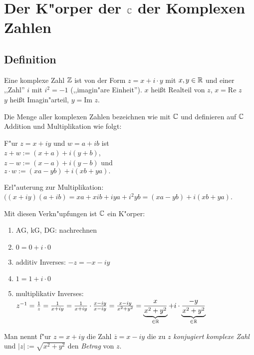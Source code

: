 \section{Der K"orper der $\mathbb{C}$ der Komplexen Zahlen} 

\subsection{Definition}
Eine komplexe Zahl $\mathbb{Z}$ ist von der Form $z=x+i\cdot y$ mit $x, y \in \mathbb{R}$ und einer ,,Zahl'' $i$ mit $i^2=-1$ (,,imagin"are Einheit''). $x$ heißt Realteil von $z$, $x=$Re $z$\\
$y$ heißt Imagin"arteil, $y=$Im $z$.

Die Menge aller komplexen Zahlen bezeichnen wie mit $\mathbb{C}$ und definieren auf $\mathbb{C}$ Addition und Multiplikation wie folgt:

F"ur $z=x+iy$ und $w=a+ib$ ist \\$z+w:= (x+a) + i (y+b)$, \\$z-w:= (x-a) + i (y-b)$ und \\$z\cdot w:= (xa-yb) + i(xb+ya).$

Erl"auterung zur Multiplikation: $((x+iy)(a+ib) = xa + xib + iya + i^2yb = (xa-yb) + i(xb+ya)$.

Mit diesen Verkn"upfungen ist $\mathbb{C}$ ein K"orper:
\begin{enumerate}
	\item
	AG, kG, DG: nachrechnen
	\item
	$0=0+i\cdot 0$
	\item
	additiv Inverses: $-z = -x-iy$
	\item
	$1=1+i\cdot 0$
	\item
	multiplikativ Inverses: $z^{-1}= \frac{1}{z}= \frac{1}{x+iy}=\frac{1}{x+iy}\cdot\frac{x-iy}{x-iy}= \frac{x-iy}{x^2+y^2}=\underbrace{\frac{x}{x^2+y^2}}_{\in \mathbb{R}}+ i \cdot \underbrace{\frac{-y}{x^2+y^2}}_{\in \mathbb{R}}$
\end{enumerate}
	Man nennt f"ur $z=x+iy$ die Zahl $ \overline{z} = x-iy$ die zu $z$ \emph{konjugiert komplexe Zahl} und $|z| := \sqrt{x^2+y^2}$ den \emph{Betrag} von $z$.

